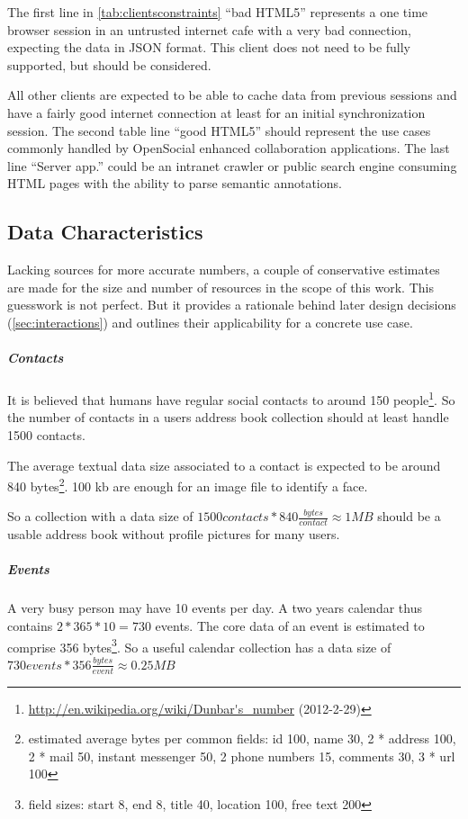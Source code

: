 \documentclass[12pt,a4paper,twoside]{scrartcl}		%
\newcommand{\citeurl}[2]{\url{#1} (#2)}
\begin{document}
The first line in \autoref{tab:clientsconstraints} ``bad HTML5'' represents a
one time browser session in an untrusted internet cafe with a very bad
connection, expecting the data in JSON format. This client does not need to be
fully supported, but should be considered.

All other clients are expected to be able to cache data from previous sessions
and have a fairly good internet connection at least for an initial
synchronization session. The second table line ``good HTML5'' should represent
the use cases commonly handled by OpenSocial enhanced collaboration
applications. The last line ``Server app.'' could be an intranet crawler or
public search engine consuming HTML pages with the ability to parse semantic
annotations.

\subsection{Data Characteristics}
\label{sec:data-characteristics}

Lacking sources for more accurate numbers, a couple of conservative estimates
are made for the size and number of resources in the scope of this work. This
guesswork is not perfect. But it provides a rationale behind later design
decisions (\autoref{sec:interactions}) and outlines their applicability for a
concrete use case.

\subparagraph{Contacts}

It is believed that humans have regular social contacts to around 150
people\footnote{\citeurl{http://en.wikipedia.org/wiki/Dunbar's_number}{2012-2-29}}. So
the number of contacts in a users address book collection should at least handle
1500 contacts.

The average textual data size associated to a contact is expected to be around
840 bytes\footnote{estimated average bytes per common fields: id 100, name 30, 2 *
  address 100, 2 * mail 50, instant messenger 50, 2 phone numbers 15, comments
  30, 3 * url 100}. 100 kb are enough for an image file to identify a face.

So a collection with a data size of $1500 contacts * 840 \frac{bytes}{contact}
\approx 1MB$ should be a usable address book without profile pictures for many
users.

\subparagraph{Events}

A very busy person may have 10 events per day. A two years calendar thus
contains $2*365*10=730$ events. The core data of an event is estimated to
comprise 356 bytes\footnote{field sizes: start 8, end 8, title 40, location 100,
  free text 200}. So a useful calendar collection has a data size of $730 events
* 356 \frac{bytes}{event} \approx 0.25 MB$
\end{document}

